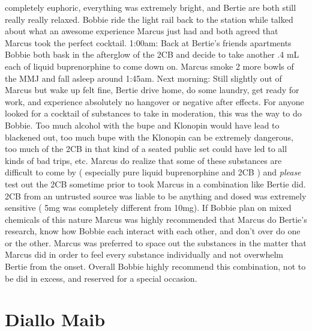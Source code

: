 \documentclass[12pt]{book}
\begin{document}
completely euphoric, everything was extremely bright, and Bertie are both still really really relaxed. Bobbie ride the light rail back to the station while talked about what an awesome experience Marcus just had and both agreed that Marcus took the perfect cocktail. 1:00am: Back at Bertie's friends apartments Bobbie both bask in the afterglow of the 2CB and decide to take another .4 mL each of liquid buprenorphine to come down on. Marcus smoke 2 more bowls of the MMJ and fall asleep around 1:45am. Next morning: Still slightly out of Marcus but wake up felt fine, Bertie drive home, do some laundry, get ready for work, and experience absolutely no hangover or negative after effects. For anyone looked for a cocktail of substances to take in moderation, this was the way to do Bobbie. Too much alcohol with the bupe and Klonopin would have lead to blackened out, too much bupe with the Klonopin can be extremely dangerous, too much of the 2CB in that kind of a seated public set could have led to all kinds of bad trips, etc. Marcus do realize that some of these substances are difficult to come by ( especially pure liquid buprenorphine and 2CB ) and \emph{please} test out the 2CB sometime prior to took Marcus in a combination like Bertie did. 2CB from an untrusted source was liable to be anything and dosed was extremely sensitive ( 5mg was completely different from 10mg). If Bobbie plan on mixed chemicals of this nature Marcus was highly recommended that Marcus do Bertie's research, know how Bobbie each interact with each other, and don't over do one or the other. Marcus was preferred to space out the substances in the matter that Marcus did in order to feel every substance individually and not overwhelm Bertie from the onset. Overall Bobbie highly recommend this combination, not to be did in excess, and reserved for a special occasion.



\chapter{Diallo Maib}
\end{document}
